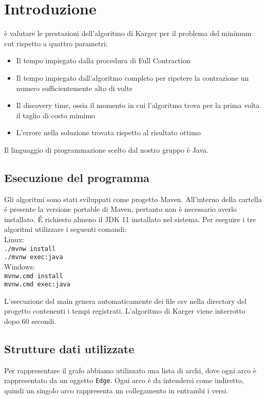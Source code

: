 \section{Introduzione}

è valutare le prestazioni dell'algoritmo di Karger per il problema del minimum cut rispetto a quattro parametri:
\begin{itemize}
    \item Il tempo impiegato dalla procedura di Full Contraction
    \item Il tempo impiegato dall'algoritmo completo per ripetere la contrazione un numero sufficientemente alto di volte
    \item Il discovery time, ossia il momento in cui l'algoritmo trova per la prima volta il taglio di costo mimimo
    \item L'errore nella soluzione trovata rispetto al risultato ottimo
\end{itemize}
Il linguaggio di programmazione scelto dal nostro gruppo è Java.

\subsection{Esecuzione del programma}
Gli algoritmi sono stati sviluppati come progetto Maven. All'interno della cartella \'e presente la versione portable di Maven, pertanto non è necessario averlo installato. \'E
richiesto almeno il JDK 11 installato nel sistema.
Per eseguire i tre algoritmi utilizzare i seguenti comandi:\\
Linux:\\
\indent \texttt{./mvnw install}\\
\indent \texttt{./mvnw exec:java}\\
Windows:\\
\indent \texttt{mvnw.cmd install}\\
\indent \texttt{mvnw.cmd exec:java}

L'esecuzione del main genera automaticamente dei file csv nella directory del progetto contenenti i tempi registrati.
L'algoritmo di Karger viene interrotto dopo 60 secondi.
\subsection{Strutture dati utilizzate}

Per rappresentare il grafo abbiamo utilizzato una lista di archi, dove ogni arco è rappresentato da un oggetto \texttt{Edge}.
Ogni arco è da intendersi come indiretto, quindi un singolo arco rappresenta un collegamento in
entrambi i versi.

